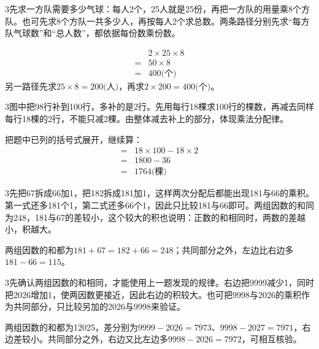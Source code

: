 \documentclass[multi=snippet,border={5bp 20bp 5bp 5bp}]{standalone}
\newenvironment{snippet}[3]{\begin{minipage}{#1bp}\color{answerred}\fontsize{#2}{#3}\selectfont\raggedright}{\end{minipage}}
\begin{document}
\begin{snippet}{505}{11.5}{14}\begin{multicols}{3}\raggedcolumns 先求一方队需要多少气球：每人2个，25人就是25份，再把一方队的用量乘8个方队。也可先求8个方队一共多少人，再按每人2个求总数。两条路径分别先求“每方队气球数”和“总人数”，都依据每份数乘份数。\par \[\begin{aligned}&2\times25\times8\\={}&50\times8\\={}&400\text{(个)}\end{aligned}\]另一路径先求\(25\times8=200\text{(人)}\)\allowbreak ，再求\(2\times200=400\text{(个)}\)\allowbreak 。\end{multicols}\end{snippet}
\begin{snippet}{505}{11.5}{14}\begin{multicols}{3}\raggedcolumns 图中把98行补到100行，多补的是2行。先用每行18棵求100行的棵数，再减去同样每行18棵的2行，不能只减2棵。由整体减去补上的部分，体现乘法分配律。\par 把题中已列的括号式展开，继续算：\[\begin{aligned}={}&18\times100-18\times2\\={}&1800-36\\={}&1764\text{(棵)}\end{aligned}\]\end{multicols}\end{snippet}
\begin{snippet}{505}{11.5}{14}\begin{multicols}{3}\raggedcolumns 先把67拆成66加1，把182拆成181加1，这样两次分配后都能出现181与66的乘积。第一式还多181个1，第二式还多66个1，因此只比较181与66即可。两组因数的和同为248，181与67的差较小，这个较大的积也说明：正数的和相同时，两数的差越小，积越大。\par 两组因数的和都为\(181+67=182+66=248\)\allowbreak ；共同部分之外，左边比右边多\(181-66=115\)\allowbreak 。\end{multicols}\end{snippet}
\begin{snippet}{505}{11.5}{14}\begin{multicols}{3}\raggedcolumns 先确认两组因数的和相同，才能使用上一题发现的规律。右边把9999减少1，同时把2026增加1，使两因数更接近，因此右边的积较大。也可把9998与2026的乘积作为共同部分，只比较另加的2026与9998来验证。\par 两组因数的和都为12025，差分别为\(9999-2026=7973\)\allowbreak 、\(9998-2027=7971\)\allowbreak ，右边差较小。共同部分之外，右边又比左边多\(9998-2026=7972\)\allowbreak ，可相互核验。\end{multicols}\end{snippet}
\end{document}
